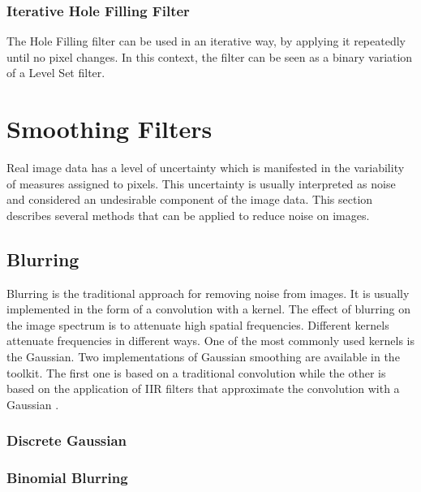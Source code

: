 


\subsubsection{Iterative Hole Filling Filter}

The Hole Filling filter can be used in an iterative way, by applying it
repeatedly until no pixel changes. In this context, the filter can be seen as a
binary variation of a Level Set filter.




\section{Smoothing Filters}
\label{sec:SmoothingFilters}

Real image data has a level of uncertainty which is manifested in the
variability of measures assigned to pixels. This uncertainty is usually
interpreted as noise and considered an undesirable component of the image
data. This section describes several methods that can be applied to reduce
noise on images.

\subsection{Blurring}
\label{sec:BlurringFilters}

Blurring is the traditional approach for removing noise from images. It is
usually implemented in the form of a convolution with a kernel. The effect of
blurring on the image spectrum is to attenuate high spatial
frequencies.  Different kernels attenuate frequencies in different ways. One
of the most commonly used kernels is the Gaussian. Two implementations of
Gaussian smoothing are available in the toolkit. The first one is based on a
traditional convolution while the other is based on the application of IIR
filters that approximate the convolution with a Gaussian
\cite{Deriche1990,Deriche1993}.

\subsubsection{Discrete Gaussian}
\label{sec:DiscreteGaussianImageFilter}



\subsubsection{Binomial Blurring}
\label{sec:BinomialBlurImageFilter}



